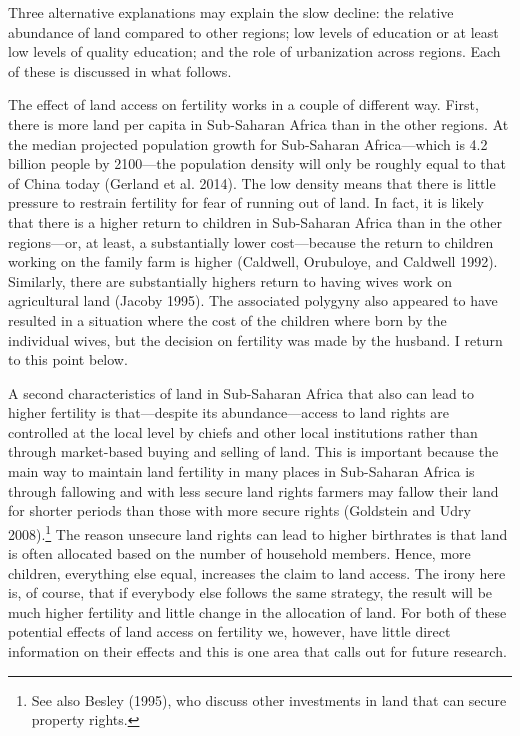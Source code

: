 \documentclass[]{article}
\begin{document}
Three alternative explanations may explain the slow decline: the relative abundance of land compared to other regions; low levels of education or at least low levels of quality education; and the role of urbanization across regions. Each of these is discussed in what follows.

The effect of land access on fertility works in a couple of different way. First, there is more land per capita in Sub-Saharan Africa than in the other regions. At the median projected population growth for Sub-Saharan Africa---which is 4.2 billion people by 2100---the population density will only be roughly equal to that of China today (Gerland et al. 2014). The low density means that there is little pressure to restrain fertility for fear of running out of land. In fact, it is likely that there is a higher return to children in Sub-Saharan Africa than in the other regions---or, at least, a substantially lower cost---because the return to children working on the family farm is higher (Caldwell, Orubuloye, and Caldwell 1992). Similarly, there are substantially highers return to having wives work on agricultural land (Jacoby 1995). The associated polygyny also appeared to have resulted in a situation where the cost of the children where born by the individual wives, but the decision on fertility was made by the husband. I return to this point below.

A second characteristics of land in Sub-Saharan Africa that also can lead to higher fertility is that---despite its abundance---access to land rights are controlled at the local level by chiefs and other local institutions rather than through market-based buying and selling of land. This is important because the main way to maintain land fertility in many places in Sub-Saharan Africa is through fallowing and with less secure land rights farmers may fallow their land for shorter periods than those with more secure rights (Goldstein and Udry 2008).\footnote{See also Besley (1995), who discuss other investments in land that can secure property rights.} The reason unsecure land rights can lead to higher birthrates is that land is often allocated based on the number of household members. Hence, more children, everything else equal, increases the claim to land access. The irony here is, of course, that if everybody else follows the same strategy, the result will be much higher fertility and little change in the allocation of land. For both of these potential effects of land access on fertility we, however, have little direct information on their effects and this is one area that calls out for future research.
\end{document}
